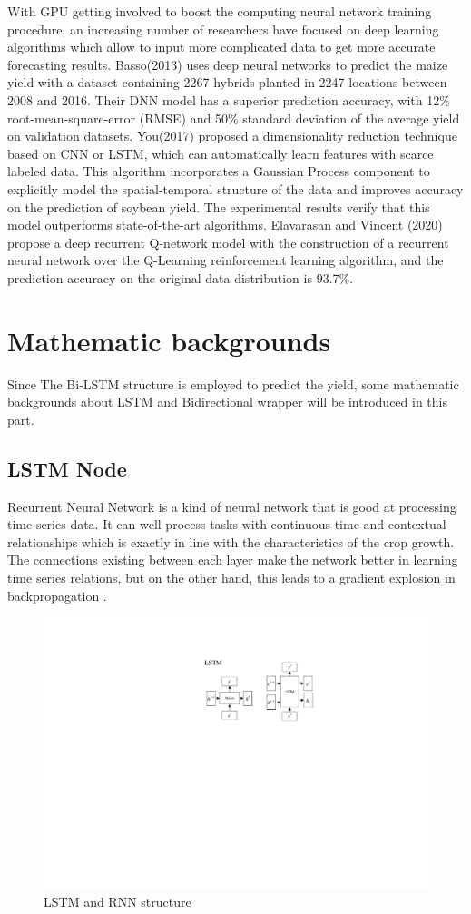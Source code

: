 \documentclass[conference, a4paper]{IEEEtran}
\begin{document}
  With GPU getting involved to boost the computing neural network training procedure, an increasing number of researchers have focused on deep learning algorithms which allow to input more complicated data to get more accurate forecasting results. Basso(2013)\cite{bassoReviewCropYield2013} uses deep neural networks to predict the maize yield with a dataset containing 2267 hybrids planted in 2247 locations between 2008 and 2016. Their DNN model has a superior prediction accuracy, with 12\% root-mean-square-error (RMSE) and 50\% standard deviation of the average yield on validation datasets. You(2017)\cite{youDeepGaussianProcess2017} proposed a dimensionality reduction technique based on CNN or LSTM, which can automatically learn features with scarce labeled data. This algorithm incorporates a Gaussian Process component to explicitly model the spatial-temporal structure of the data and improves accuracy on the prediction of soybean yield. The experimental results verify that this model outperforms state-of-the-art algorithms. Elavarasan and Vincent (2020) \cite{elavarasanCropYieldPrediction2020} propose a deep recurrent Q-network model with the construction of a recurrent neural network over the Q-Learning reinforcement learning algorithm, and the prediction accuracy on the original data distribution is 93.7\%.


\section{Mathematic backgrounds} \label{sec:MB}
  Since The Bi-LSTM structure is employed to predict the yield, some mathematic backgrounds about LSTM and Bidirectional wrapper will be introduced in this part.
  \subsection{LSTM Node}
    Recurrent Neural Network is a kind of neural network that is good at processing time-series data. It can well process tasks with continuous-time and contextual relationships which is exactly in line with the characteristics of the crop growth. The connections existing between each layer make the network better in learning time series relations, but on the other hand, this leads to a gradient explosion in backpropagation \cite{hochreiterLongShorttermMemory1997}.

    \begin{figure}[htbp]
      \centerline{\includegraphics[width=0.7\linewidth]{figures/LSTM_struc.pdf}}
      \caption{LSTM and RNN structure}
      \label{fig:LSTM}
    \end{figure}
\end{document}

